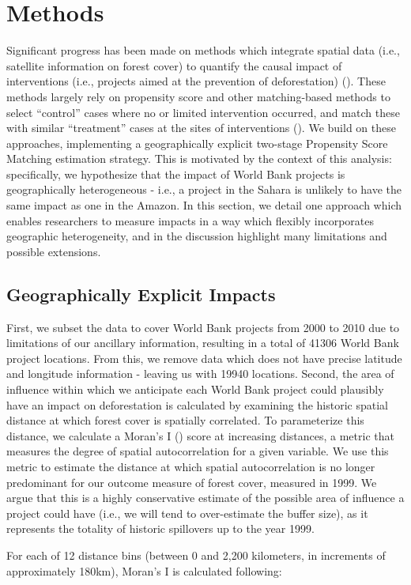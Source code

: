 \documentclass[sustainability,article,submit,moreauthors,pdftex,10pt,a4paper]{mdpi}
\begin{document}
\section{Methods}
Significant progress has been made on methods which integrate spatial data (i.e., satellite information on forest cover) to quantify the causal impact of interventions (i.e., projects aimed at the prevention of deforestation) (\cite{nelson_effectiveness_2011}). These methods largely rely on propensity score and other matching-based methods to select ``control'' cases where no or limited intervention occurred, and match these with similar ``treatment'' cases at the sites of interventions (\cite{andam_measuring_2008}). We build on these approaches, implementing a geographically explicit two-stage Propensity Score Matching estimation strategy. This is motivated by the context of this analysis: specifically, we hypothesize that the impact of World Bank projects is geographically heterogeneous - i.e., a project in the Sahara is unlikely to have the same impact as one in the Amazon. In this section, we detail one approach which enables researchers to measure impacts in a way which flexibly incorporates geographic heterogeneity, and in the discussion highlight many limitations and possible extensions.

\subsection{Geographically Explicit Impacts}
First, we subset the data to cover World Bank projects from 2000 to 2010 due to limitations of our ancillary information, resulting in a total of 41306 World Bank project locations. From this, we remove data which does not have precise latitude and longitude information - leaving us with 19940 locations. Second, the area of influence within which we anticipate each World Bank project could plausibly have an impact on deforestation is calculated by examining the historic spatial distance at which forest cover is spatially correlated. To parameterize this distance, we calculate a Moran's I (\cite{getis_analysis_1992}) score at increasing distances, a metric that measures the degree of spatial autocorrelation for a given variable. We use this metric to estimate the distance at which spatial autocorrelation is no longer predominant for our outcome measure of forest cover, measured in 1999. We argue that this is a highly conservative estimate of the possible area of influence a project could have (i.e., we will tend to over-estimate the buffer size), as it represents the totality of historic spillovers up to the year 1999.
\par
For each of 12 distance bins (between 0 and 2,200 kilometers, in increments of approximately 180km), Moran's I is calculated following:
\end{document}
